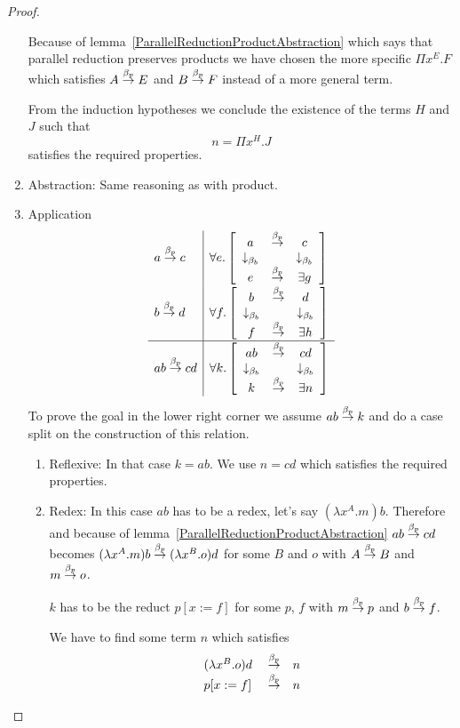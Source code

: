 \begin{theorem}
\begin{proof}
\begin{enumerate}
        Because of lemma~\ref{ParallelReductionProductAbstraction} which says
        that parallel reduction preserves products we have chosen the more
        specific $\Pi x^E.F$ which satisfies $A \stackrel{\beta_p}{\to} E$ and $B \stackrel{\beta_p}{\to} F$
        instead of a more general term.

        From the induction hypotheses we conclude the existence of the terms $H$
        and $J$ such that
        $$
            n = \Pi x^H. J
        $$
        satisfies the required properties.

        \item Abstraction: Same reasoning as with product.

        \item Application
        $$
        \begin{array}{l|l}
            a \stackrel{\beta_p}{\to} c
            &
            \forall e. \left[ \begin{array}{ccc} a & \stackrel{\beta_p}{\to} & c \\ \downarrow_{\beta_b} & & \downarrow_{\beta_b} \\ e & \stackrel{\beta_p}{\to} & \exists g \end{array} \right]
            \\
            b \stackrel{\beta_p}{\to} d
            &
            \forall f. \left[ \begin{array}{ccc} b & \stackrel{\beta_p}{\to} & d \\ \downarrow_{\beta_b} & & \downarrow_{\beta_b} \\ f & \stackrel{\beta_p}{\to} & \exists h \end{array} \right]
            \\
            \hline
            a b \stackrel{\beta_p}{\to} c d
            &
            \forall k. \left[ \begin{array}{ccc} ab & \stackrel{\beta_p}{\to} & cd \\ \downarrow_{\beta_b} & & \downarrow_{\beta_b} \\ k & \stackrel{\beta_p}{\to} & \exists n \end{array} \right]
        \end{array}
        $$
        To prove the goal in the lower right corner we assume $a b \stackrel{\beta_p}{\to} k$
        and do a case split on the construction of this relation.

            \begin{enumerate}
            \item Reflexive: In that case $k = a b$. We use $n = c d$ which
            satisfies the required properties.

            \item Redex: In this case $a b$ has to be a redex, let's say
            $(\lambda x^A.m) b$. Therefore and because of
            lemma~\ref{ParallelReductionProductAbstraction} $a b \stackrel{\beta_p}{\to} c d$
            becomes $(\lambda x^A. m) b \stackrel{\beta_p}{\to} (\lambda x^B. o) d$ for some
            $B$ and $o$ with $A \stackrel{\beta_p}{\to} B$ and $m \stackrel{\beta_p}{\to} o$.

            $k$ has to be the reduct $p[x:=f]$ for some $p$, $f$ with $m
            \stackrel{\beta_p}{\to} p$ and $b \stackrel{\beta_p}{\to} f$.

            We have to find some term $n$ which satisfies
            $$
            \begin{array}{lll}
                (\lambda x^B. o) d &\preduce& n
                \\
                p[x:=f] &\preduce& n
            \end{array}
            $$


\end{enumerate}
\end{enumerate}
\end{proof}
\end{theorem}
